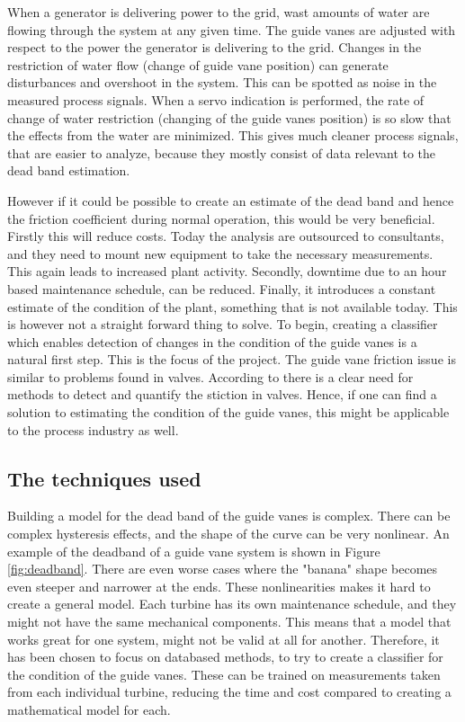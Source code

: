         When a generator is delivering power to the grid, wast amounts of water are flowing through the system at any given time. The guide vanes are adjusted with respect to the power the generator is delivering to the grid. Changes in the restriction of water flow (change of guide vane position) can generate disturbances and overshoot in the system. This can be spotted as noise in the measured process signals. When a servo indication is performed, the rate of change of water restriction (changing of the guide vanes position) is so slow that the effects from the water are minimized. This gives much cleaner process signals, that are easier to analyze, because they mostly consist of data relevant to the dead band estimation.
        
        However if it could be possible to create an estimate of the dead band and hence the friction coefficient during normal operation, this would be very beneficial. Firstly this will reduce costs. Today the analysis are outsourced to consultants, and they need to mount new equipment to take the necessary measurements. This again leads to increased plant activity. Secondly, downtime due to an hour based maintenance schedule, can be reduced. Finally, it introduces a constant estimate of the condition of the plant, something that is not available today. This is however not a straight forward thing to solve. To begin, creating a classifier which enables detection of changes in the condition of the guide vanes is a natural first step. This is the focus of the project. The guide vane friction issue is similar to problems found in valves. According to \cite{Dozat} there is a clear need for methods to detect and quantify the stiction in valves. Hence, if one can find a solution to estimating the condition of the guide vanes, this might be applicable to the process industry as well. 
        
        
    \subsection{The techniques used}    
        Building a model for the dead band of the guide vanes is complex. There can be complex hysteresis effects, and the shape of the curve can be very nonlinear. An example of the deadband of a guide vane system is shown in Figure \ref{fig:deadband}. There are even worse cases where the "banana" shape becomes even steeper and narrower at the ends. These nonlinearities makes it hard to create a general model. Each turbine has its own maintenance schedule, and they might not have the same mechanical components. This means that a model that works great for one system, might not be valid at all for another. Therefore, it has been chosen to focus on databased methods, to try to create a classifier for the condition of the guide vanes. These can be trained on measurements taken from each individual turbine, reducing the time and cost compared to creating a mathematical model for each. 
        
